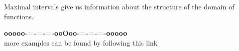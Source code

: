 \documentclass{ximera}
\begin{document}
Maximal intervals give us information about the structure of the domain of functions.

















\begin{center}
\textbf{\textcolor{green!50!black}{ooooo-=-=-=-ooOoo-=-=-=-ooooo}} \\

more examples can be found by following this link\\ 

\end{center}
\end{document}
